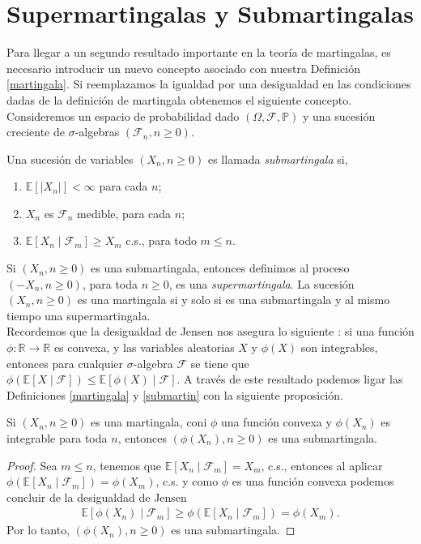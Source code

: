 \section{Supermartingalas y Submartingalas}
Para llegar a un segundo resultado importante en la teoría de martingalas, es necesario introducir un nuevo concepto asociado con nuestra Definición \ref{martingala}. Si reemplazamos la igualdad por una desigualdad en las condiciones dadas de la definición de martingala obtenemos el siguiente concepto. \\

Consideremos un espacio de probabilidad dado $(\Omega, \mathcal{F}, \mathbb{P})$ y una sucesión creciente de $\sigma$-algebras $(\mathcal{F}_n, n \geq 0)$.

\begin{definition}
\label{submartin}
	Una sucesión de variables $(X_n, n \geq 0)$ es llamada \emph{submartingala} si,
	\begin{enumerate}
		\item $\mathbb{E}[|X_n|] < \infty$ para cada $n$;
		\item $X_n$ es $\mathcal{F}_n$ medible, para cada $n$;
		\item $\mathbb{E}[X_n \mid \mathcal{F}_m] \geq X_m$ c.s., para todo $m \leq n$.
	\end{enumerate}
\end{definition}

Si $(X_n, n \geq 0)$ es una submartingala, entonces definimos al proceso $(- X_n, n \geq 0)$, para toda $n \geq 0$, es una \emph{supermartingala}. La sucesión $(X_n, n \geq 0)$ es una martingala si y solo si es una submartingala y al mismo tiempo una supermartingala. \\

Recordemos que la desigualdad de Jensen nos asegura lo siguiente \cite[p.~205]{jacodprotter}: si una función $\phi: \mathbb{R} \rightarrow \mathbb{R}$ es convexa, y las variables aleatorias $X$ y $\phi(X)$ son integrables, entonces para cualquier $\sigma$-algebra $\mathcal{F}$ se tiene que $\phi(\mathbb{E}[X \mid \mathcal{F}]) \leq \mathbb{E}[\phi(X) \mid \mathcal{F}]$. A través de este resultado podemos ligar las Definiciones \ref{martingala} y \ref{submartin} con la siguiente proposición.

\begin{proposition}
\label{convexa}
	Si $(X_n, n \geq 0)$ es una martingala, coni $\phi$ una función convexa y $\phi(X_n)$ es integrable para toda $n$, entonces $(\phi(X_n), n \geq 0)$ es una submartingala.
\end{proposition}
\begin{proof}
	Sea $m \leq n$, tenemos que $\mathbb{E}[X_n \mid \mathcal{F}_m] = X_m$, c.s., entonces al aplicar $\phi(\mathbb{E}[X_n \mid \mathcal{F}_m]) = \phi(X_m)$, c.s. y como $\phi$ es una función convexa podemos concluir de la desigualdad de Jensen
	\begin{align*}
		\mathbb{E}[\phi(X_n) \mid \mathcal{F}_m] \geq \phi(\mathbb{E}[X_n \mid \mathcal{F}_m]) = \phi(X_m).
	\end{align*}
	Por lo tanto, $(\phi(X_n), n \geq 0)$ es una submartingala.
\end{proof}

